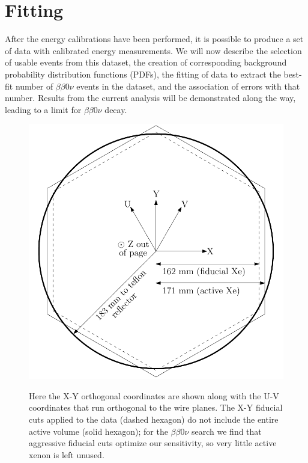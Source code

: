 \section{Fitting}\label{sec:ResultFitting}

After the energy calibrations have been performed, it is possible to produce a set of data with calibrated energy measurements.  We will now describe the selection of usable events from this dataset, the creation of corresponding background probability distribution functions (PDFs), the fitting of data to extract the best-fit number of $\beta\beta 0\nu$ events in the dataset, and the association of errors with that number.  Results from the current analysis will be demonstrated along the way, leading to a limit for $\beta\beta 0\nu$ decay.

\begin{figure}
\begin{center}
\includegraphics[keepaspectratio=true,width=\textwidth]{FidVolDiagram_Dissertation.pdf}
\end{center}
\renewcommand{\baselinestretch}{1}
\small\normalsize
\begin{quote}
\caption{Here the X-Y orthogonal coordinates are shown along with the U-V coordinates that run orthogonal to the wire planes.  The X-Y fiducial cuts applied to the data (dashed hexagon) do not include the entire active volume (solid hexagon); for the $\beta\beta 0\nu$ search we find that aggressive fiducial cuts optimize our sensitivity, so very little active xenon is left unused.}
\label{fig:FidVolDiagram}
\end{quote}
\end{figure}
\renewcommand{\baselinestretch}{2}
\small\normalsize

